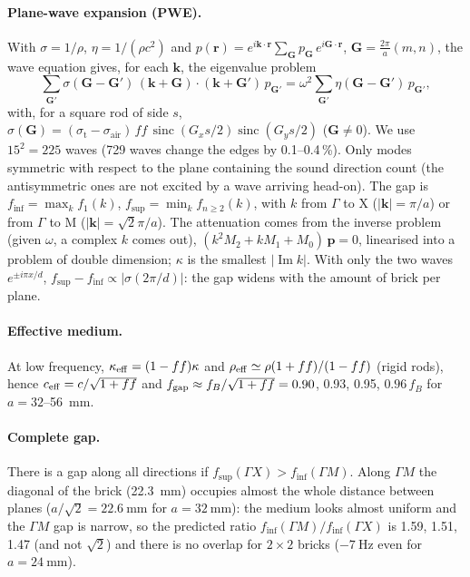 \documentclass[9pt,a4paper,twocolumn]{extarticle}
\newcommand{\umm}{\milli\metre}
\newcommand{\uHz}{\hertz}
\newcommand{\GX}{\ensuremath{\Gamma X}}
\newcommand{\GM}{\ensuremath{\Gamma M}}
\newcommand{\finf}{\ensuremath{f_{\mathrm{inf}}}}
\newcommand{\fsup}{\ensuremath{f_{\mathrm{sup}}}}
\begin{document}
\paragraph{Plane-wave expansion (PWE).} With $\sigma = 1/\rho$, $\eta = 1/(\rho c^2)$ and $p(\mathbf r) = e^{i\mathbf k\cdot\mathbf r}\sum_{\mathbf G} p_{\mathbf G}\, e^{i\mathbf G\cdot\mathbf r}$, $\mathbf G = \tfrac{2\pi}{a}(m,n)$, the wave equation gives, for each $\mathbf k$, the eigenvalue problem
\begin{equation*}
  \sum_{\mathbf G'}\sigma(\mathbf G-\mathbf G')\,(\mathbf k+\mathbf G)\cdot(\mathbf k+\mathbf G')\,p_{\mathbf G'}
  = \omega^2\sum_{\mathbf G'}\eta(\mathbf G-\mathbf G')\,p_{\mathbf G'},
\end{equation*}
with, for a square rod of side $s$, $\sigma(\mathbf G) = (\sigma_\text{t}-\sigma_\text{air})\,f\!f\,\operatorname{sinc}(G_xs/2)\operatorname{sinc}(G_ys/2)$ ($\mathbf G \neq 0$). We use $15^2 = 225$ waves (729 waves change the edges by 0.1--0.4\,\%). Only modes symmetric with respect to the plane containing the sound direction count (the antisymmetric ones are not excited by a wave arriving head-on). The gap is $f_\text{inf} = \max_k f_1(k)$, $f_\text{sup} = \min_k f_{n\ge2}(k)$, with $k$ from $\Gamma$ to X ($|\mathbf k| = \pi/a$) or from $\Gamma$ to M ($|\mathbf k| = \sqrt{2}\pi/a$). The attenuation comes from the inverse problem (given $\omega$, a complex $k$ comes out), $(k^2 M_2 + k M_1 + M_0)\,\mathbf p = 0$, linearised into a problem of double dimension; $\kappa$ is the smallest $|\operatorname{Im} k|$. With only the two waves $e^{\pm i\pi x/d}$, $f_\text{sup} - f_\text{inf} \propto |\sigma(2\pi/d)|$: the gap widens with the amount of brick per plane.

\paragraph{Effective medium.} At low frequency, $\kappa_{\rm eff}=(1-ff)\kappa$ and $\rho_{\rm eff}\simeq\rho(1+ff)/(1-ff)$ (rigid rods), hence $c_{\rm eff}=c/\sqrt{1+ff}$ and $f_{\rm gap}\approx f_B/\sqrt{1+ff}=0.90$, 0.93, 0.95, $0.96\,f_B$ for $a=32$--\SI{56}{\umm}.

\paragraph{Complete gap.} There is a gap along all directions if $\fsup(\GX)>\finf(\GM)$. Along \GM{} the diagonal of the brick (\SI{22.3}{\umm}) occupies almost the whole distance between planes ($a/\sqrt2=\SI{22.6}{\umm}$ for $a=\SI{32}{\umm}$): the medium looks almost uniform and the \GM{} gap is narrow, so the predicted ratio $\finf(\GM)/\finf(\GX)$ is 1.59, 1.51, 1.47 (and not $\sqrt2$) and there is no overlap for $2\times2$ bricks ($-\SI{7}{\uHz}$ even for $a=\SI{24}{\umm}$).
\end{document}
